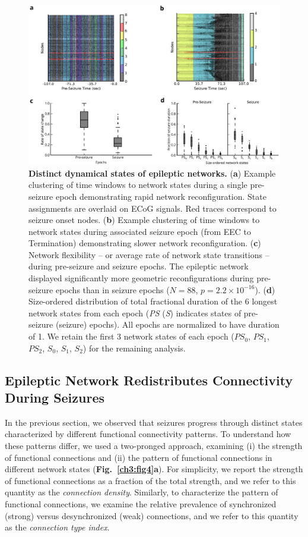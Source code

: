 \begin{figure}[H]
    \centering
    \includegraphics[width=\textwidth]{panel3.eps}
\caption[Discrete functional states of epileptic networks]{\textbf{Distinct dynamical states of epileptic networks.} (\textbf{a}) Example clustering of time windows to network states during a single pre-seizure epoch demonstrating rapid network reconfiguration. State assignments are overlaid on ECoG signals. Red traces correspond to seizure onset nodes. (\textbf{b}) Example clustering of time windows to network states during associated seizure epoch (from EEC to Termination) demonstrating slower network reconfiguration. (\textbf{c}) Network flexibility -- or average rate of network state transitions -- during pre-seizure and seizure epochs. The epileptic network displayed significantly more geometric reconfigurations during pre-seizure epochs than in seizure epochs ($N=88$, $p=2.2\times10^{-16}$). (\textbf{d}) Size-ordered distribution of total fractional duration of the 6 longest network states from each epoch (\textit{PS} (\textit{S}) indicates states of pre-seizure (seizure) epochs). All epochs are normalized to have duration of 1. We retain the first 3 network states of each epoch ($PS_0$, $PS_1$, $PS_2$, $S_0$, $S_1$, $S_2$) for the remaining analysis.} \label{ch3:fig3}
\end{figure}

\subsection{Epileptic Network Redistributes Connectivity During Seizures}
In the previous section, we observed that seizures progress through distinct states characterized by different functional connectivity patterns. To understand how these patterns differ, we used a two-pronged approach, examining (i) the strength of functional connections and (ii) the pattern of functional connections in different network states (\textbf{Fig.~\ref{ch3:fig4}a}). For simplicity, we report the strength of functional connections as a fraction of the total strength, and we refer to this quantity as the \emph{connection density}. Similarly, to characterize the pattern of functional connections, we examine the relative prevalence of synchronized (strong) versus desynchronized (weak) connections, and we refer to this quantity as the \emph{connection type index}.

